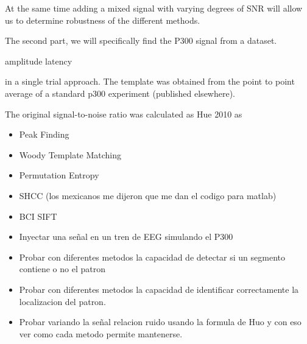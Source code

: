\documentclass[sensors,article,submit,moreauthors,pdftex,10pt,a4paper]{mdpi}
\begin{document}
At the same time adding a mixed signal with varying degrees of SNR will allow us to determine robustness of the different methods.

The second part, we will specifically find the P300 signal from a dataset.

amplitude
latency

in a single trial approach.  The template was obtained from the point to point average of a standard p300 experiment (published elsewhere).

The original signal-to-noise ratio was calculated as Hue 2010 as 

\begin{itemize}
\item Peak Finding
\item Woody Template Matching
\item Permutation Entropy
\item SHCC (los mexicanos me dijeron que me dan el codigo para matlab)
\item BCI SIFT
\end{itemize}

\begin{itemize}
\item Inyectar una señal en un tren de EEG simulando el P300
\item Probar con diferentes metodos la capacidad de detectar si un segmento contiene o no el patron
\item Probar con diferentes metodos la capacidad de identificar correctamente la localizacion del patron.
\item Probar variando la señal relacion ruido usando la formula de Huo y con eso ver como cada metodo permite mantenerse.
\end{itemize}






%
%
%
%
%
\end{document}
